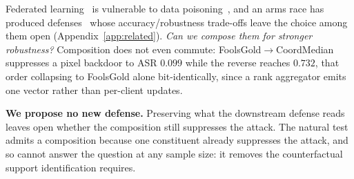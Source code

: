 \documentclass{article}
\begin{document}
\noindent Federated learning~\citep{mcmahan2017communication} is vulnerable to data poisoning~\citep{chen2017targeted,bagdasaryan2020backdoor}, and an arms race has produced defenses~\citep{fung2020foolsgold,pillutla2022robust,yin2018byzantine,blanchard2017machine} whose accuracy/robustness trade-offs leave the choice among them open (Appendix~\ref{app:related}). \emph{Can we compose them for stronger robustness?} Composition does not even commute: FoolsGold$\to$CoordMedian suppresses a pixel backdoor to ASR $0.099$ while the reverse reaches $0.732$, that order collapsing to FoolsGold alone bit-identically, since a rank aggregator emits one vector rather than per-client updates.

\noindent \textbf{We propose no new defense.} Preserving what the downstream defense reads leaves open whether the composition still suppresses the attack. The natural test admits a composition because one constituent already suppresses the attack, and so cannot answer the question at any sample size: it removes the counterfactual support identification requires.
\end{document}
